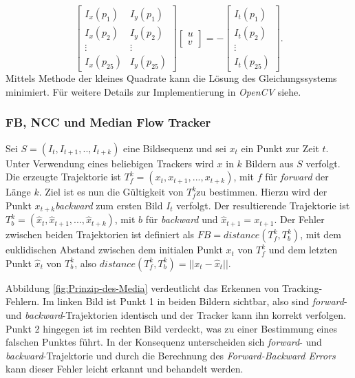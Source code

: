 \begin{enumerate}
\[
\left[\begin{array}{cc}
I_{x}(p_{1}) & I_{y}(p_{1})\\
I_{x}(p_{2}) & I_{y}(p_{2})\\
\vdots & \vdots\\
I_{x}(p_{25}) & I_{y}(p_{25})
\end{array}\right]\left[\begin{array}{c}
u\\
v
\end{array}\right]=-\left[\begin{array}{c}
I_{t}(p_{1})\\
I_{t}(p_{2})\\
\vdots\\
I_{t}(p_{25})
\end{array}\right].
\]
Mittels Methode der kleines Quadrate kann die Lösung des Gleichungssystems minimiert. Für weitere Details zur Implementierung in \textit{OpenCV}
siehe\cite{key-4}.
\end{enumerate}

\subsubsection{FB, NCC und Median Flow Tracker}
Sei $S=(I_{t},I_{t+1},..,I_{t+k})$ eine Bildsequenz und sei $x_{t}$ ein Punkt zur Zeit $t$. Unter Verwendung eines beliebigen Trackers wird $x$ in $k$ Bildern aus $S$ verfolgt. Die erzeugte Trajektorie ist $T_{f}^{k}=(x_{t},x_{t+1},...,x_{t+k})$, mit $f$ für \textit{forward} der Länge $k$. Ziel ist es nun die Gültigkeit von $T_{f}^{k}$zu bestimmen. Hierzu wird der Punkt $x_{t+k}$\textit{backward} zum ersten Bild $I_{t}$ verfolgt. Der resultierende Trajektorie ist $T_{b}^{k}=(\hat{x}_{t},\hat{x}_{t+1},...,\hat{x}_{t+k})$, mit $b$ für \textit{backward} und $\hat{x}_{t+1}=x_{t+1}$. Der Fehler zwischen beiden Trajektorien ist definiert als $FB=distance(T_{f}^{k},T_{b}^{k})$, mit dem euklidischen Abstand zwischen dem initialen Punkt $x_{t}$ von $T_{f}^{k}$ und dem letzten Punkt $\hat{x}_{t}$ von $T_{b}^{k}$, also $distance(T_{f}^{k},T_{b}^{k})=||x_{t}-\hat{x}_{t}||$.

Abbildung \ref{fig:Prinzip-des-Media} verdeutlicht das Erkennen von Tracking-Fehlern. Im linken Bild ist Punkt 1 in beiden Bildern sichtbar, also sind \textit{forward}- und \textit{backward}-Trajektorien identisch und der Tracker kann ihn korrekt verfolgen. Punkt 2 hingegen ist im rechten Bild verdeckt, was zu einer Bestimmung eines falschen Punktes führt. In der Konsequenz unterscheiden sich \textit{forward}- und \textit{backward}-Trajektorie und durch die Berechnung des \textit{Forward-Backward Errors} kann dieser Fehler leicht erkannt und behandelt werden.

